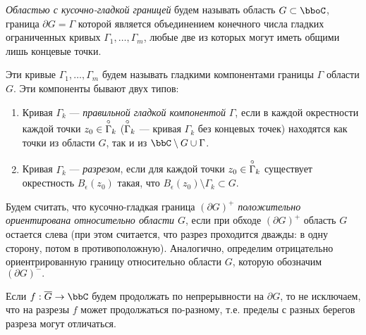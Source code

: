 \begin{defn} \label{ch33defn1}
\textit{Областью с кусочно-гладкой границей} будем называть область $G \subset \bboC$, граница $\partial G=\Gamma$ которой является объединением конечного числа гладких ограниченных кривых $\Gamma_1 , \dots , \Gamma_m$, любые две из которых могут иметь общими лишь концевые точки. 

Эти кривые $\Gamma_1 , \dots , \Gamma_m$ будем называть гладкими компонентами границы $\Gamma$ области $G$. Эти компоненты бывают двух типов:
\end{defn}

\begin{enumerate}
\item
Кривая $\Gamma_k$ --- \textit{правильной гладкой компонентой} $\Gamma$, если в каждой окрестности каждой точки $z_0 \in \;\buildrel\circ\over\Gamma_k$ ($\buildrel\circ\over\Gamma_k$ --- кривая $\Gamma_k$ без концевых точек) находятся как точки из области $G$, так и из $\bbC \setminus G\cup\Gamma$. 

\item
Кривая $\Gamma_k$ --- \textit{разрезом}, если для каждой точки $z_0 \in\; \buildrel\circ\over\Gamma_k$ существует окрестность $B_\epsilon(z_0)$ такая, что $B_\epsilon(z_0)\setminus\Gamma_k \subset G$.
\end{enumerate}
\begin{defn} \label{ch33defn2} 
Будем считать, что кусочно-гладкая граница $(\partial G)^{+}$ \textit{положительно ориентирована относительно области $G$}, если при обходе $(\partial G)^{+}$ область $G$ остается слева (при этом считается, что разрез проходится дважды: в одну сторону, потом в противоположную). Аналогично, определим отрицательно ориентрированную границу относительно области $G$, которую обозначим $(\partial G)^{-}.$
\end{defn}

Если $f:\overline{G}\to\bbC$ будем продолжать по непрерывности на $\partial G$, то не исключаем, что на разрезы $f$ может продолжаться по-разному, т.е. пределы с разных берегов разреза могут отличаться. 

